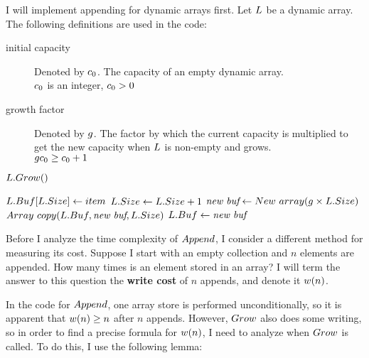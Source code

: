 \HdrDynArrayImpl

I will implement appending for dynamic arrays first. Let $\VarList$ be a dynamic array. The following definitions are used in the code:

\begin{description}
	\item[initial capacity] Denoted by $c_0$. The capacity of an empty dynamic array.\\
	{\HdrAssumptions} $c_0$ is an integer, $c_0 > 0$
	\item[growth factor] Denoted by $g$. The factor by which the current capacity is multiplied to get the new capacity when $\VarList$ is non-empty and grows.\\
	{\HdrAssumptions} $gc_0 \geq c_0 + 1$
\end{description}

\begin{algorithm}
	\begin{algorithmic}[1]
				\State $L.Grow()$
			\EndIf
			
			\State $L.Buf[L.Size] \gets item$
			\State $L.Size \gets L.Size + 1$
		\EndProcedure
		\Statex
		\Procedure{$\FuncGrow$}{$\VarList$}
			\State $\textit{new buf} \gets New\ array(g \times L.Size)$
			\State $Array\ copy(L.Buf, \textit{new buf}, L.Size)$
			\State $L.Buf \gets \textit{new buf}$
		\EndProcedure
	\end{algorithmic}
\end{algorithm}

\HdrTimeComplex

Before I analyze the time complexity of $Append$, I consider a different method for measuring its cost. Suppose I start with an empty collection and $n$ elements are appended. How many times is an element stored in an array? I will term the answer to this question the \textbf{write cost} of $n$ appends, and denote it $w(n)$.

In the code for $Append$, one array store is performed unconditionally, so it is apparent that $w(n) \geq n$ after $n$ appends. However, $\FuncGrow$ also does some writing, so in order to find a precise formula for $w(n)$, I need to analyze when $\FuncGrow$ is called. To do this, I use the following lemma:

